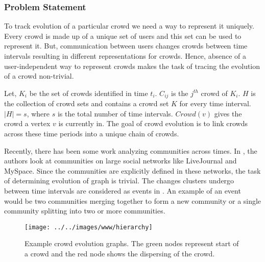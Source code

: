 \documentclass{sig-alternate}
\begin{document}
\subsubsection{Problem Statement}
To track evolution of a particular crowd we need a way to represent it uniquely.
Every crowd is made up of a unique set of users and this set can be used to
represent it. But, communication between users changes crowds between time
intervals resulting in different representations for crowds. Hence, absence of a
user-independent way to represent crowds makes the task of tracing the evolution
of a crowd non-trivial. 

Let, $K_i$ be the set of crowds identified in time $t_i$. $C_{ij}$ is the
$j^{th}$ crowd of $K_i$. $H$ is the collection of crowd sets and contains a
crowd set $K$ for every time interval. $|H| = s$, where $s$ is the total number
of time intervals. $Crowd(v)$ gives the crowd a vertex
$v$ is currently in. The goal of crowd evolution is to link crowds across these time periods into a unique chain of crowds. 

Recently, there has been some work analyzing communities across times. In
\cite{backstrom:group}, the authors look at communities on large social networks
like LiveJournal and MySpace. Since the communities are explicitly defined in
these networks, the task of determining evolution of graph is trivial. The
changes clusters undergo between time intervals are considered as events in
\cite{asur:event}. An example of an event would be two communities merging
together to form a new community or a single community splitting into two or more
communities. 


\begin{figure}[!t]
\begin{center}
\texttt{[image: ../../images/www/hierarchy]}
\caption{Example crowd evolution graphs. The green
nodes represent start of a crowd and the red node shows the dispersing of the
crowd.}
\label{fig:hierarchy-graph}
\end{center}
\end{figure}
\end{document}

